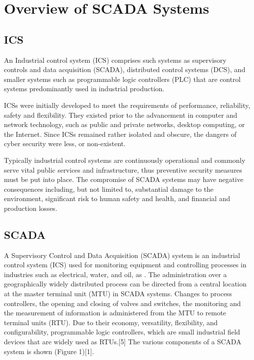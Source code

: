 \documentclass[11pt,]{article}
\begin{document}
\newpage

\section{Overview of SCADA Systems}\label{overview-of-scada-systems}

\subsection{ICS}\label{ics}

An Industrial control system (ICS) comprises such systems as supervisory
controls and data acquisition (SCADA), distributed control systems
(DCS), and smaller systems such as programmable logic controllers (PLC)
that are control systems predominantly used in industrial production.

ICSs were initially developed to meet the requirements of performance,
reliability, safety and flexibility. They existed prior to the
advancement in computer and network technology, such as public and
private networks, desktop computing, or the Internet. Since ICSs
remained rather isolated and obscure, the dangers of cyber security were
less, or non-existent.

Typically industrial control systems are continuously operational and
commonly serve vital public services and infrastructure, thus preventive
security measures must be put into place. The compromise of SCADA
systems may have negative consequences including, but not limited to,
substantial damage to the environment, significant risk to human safety
and health, and financial and production losses.

\subsection{SCADA}\label{scada}

A Supervisory Control and Data Acquisition (SCADA) system is an
industrial control system (ICS) used for monitoring equipment and
controlling processes in industries such as electrical, water, and oil,
as . The administration over a geographically widely distributed process
can be directed from a central location at the master terminal unit
(MTU) in SCADA systems. Changes to process controllers, the opening and
closing of valves and switches, the monitoring and the measurement of
information is administered from the MTU to remote terminal units (RTU).
Due to their economy, versatility, flexibility, and configurability,
programmable logic controllers, which are small industrial field devices
that are widely used as RTUs.{[}5{]} The various components of a SCADA
system is shown (Figure 1){[}1{]}.
\end{document}
